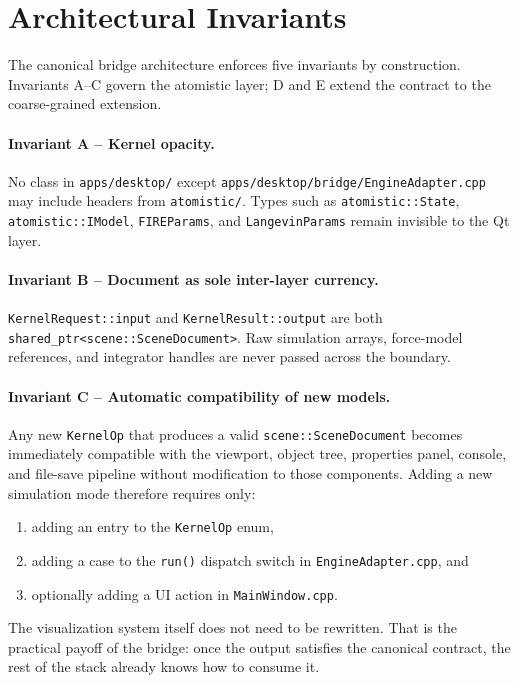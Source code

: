 ﻿\documentclass[11pt]{article}
\newcommand{\file}[1]{\texttt{#1}}
\newcommand{\type}[1]{\texttt{#1}}
\newcommand{\op}[1]{\texttt{#1}}
\begin{document}
\section{Architectural Invariants}

The canonical bridge architecture enforces five invariants by construction.
Invariants A--C govern the atomistic layer; D and E extend the contract to the
coarse-grained extension.

\paragraph{Invariant A -- Kernel opacity.}
No class in \file{apps/desktop/} except
\file{apps/desktop/bridge/EngineAdapter.cpp} may include headers from
\file{atomistic/}. Types such as \type{atomistic::State},
\type{atomistic::IModel}, \type{FIREParams}, and \type{LangevinParams}
remain invisible to the Qt layer.

\paragraph{Invariant B -- Document as sole inter-layer currency.}
\type{KernelRequest::input} and \type{KernelResult::output} are both
\type{shared\_ptr<scene::SceneDocument>}. Raw simulation arrays, force-model
references, and integrator handles are never passed across the boundary.

\paragraph{Invariant C -- Automatic compatibility of new models.}
Any new \type{KernelOp} that produces a valid \type{scene::SceneDocument}
becomes immediately compatible with the viewport, object tree, properties
panel, console, and file-save pipeline without modification to those
components. Adding a new simulation mode therefore requires only:

\begin{enumerate}
  \item adding an entry to the \type{KernelOp} enum,
  \item adding a case to the \op{run()} dispatch switch in
        \file{EngineAdapter.cpp}, and
  \item optionally adding a UI action in \file{MainWindow.cpp}.
\end{enumerate}

The visualization system itself does not need to be rewritten. That is the
practical payoff of the bridge: once the output satisfies the canonical
contract, the rest of the stack already knows how to consume it.
\end{document}
